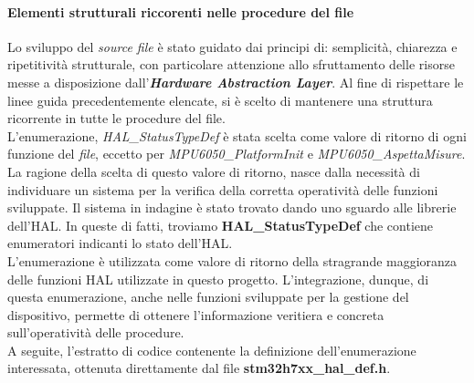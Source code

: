 \paragraph{Elementi strutturali riccorenti nelle procedure del file}
Lo sviluppo del \textit{source file} è stato guidato dai principi di: semplicità, chiarezza e ripetitività strutturale, con particolare attenzione allo sfruttamento delle risorse messe a disposizione dall'\textbf{\textit{Hardware Abstraction Layer}}.
Al fine di rispettare le linee guida precedentemente elencate, si è scelto di mantenere una struttura ricorrente in tutte le procedure del file.\\
L'enumerazione, \textit{HAL\_StatusTypeDef} è stata scelta come valore di ritorno di ogni funzione del \textit{file}, eccetto per \textit{MPU6050\_PlatformInit} e \textit{MPU6050\_AspettaMisure}.
La ragione della scelta di questo valore di ritorno, nasce dalla necessità di individuare un sistema per la verifica della corretta operatività delle funzioni sviluppate. Il sistema in indagine è stato trovato dando uno sguardo alle librerie dell'HAL.
In queste di fatti, troviamo \textbf{HAL\_StatusTypeDef} che contiene enumeratori indicanti lo stato dell'HAL.\\
L'enumerazione è utilizzata come valore di ritorno della stragrande maggioranza delle funzioni HAL utilizzate in questo progetto. L'integrazione, dunque, di questa enumerazione, anche nelle funzioni sviluppate per la gestione del dispositivo, permette di ottenere 
l'informazione veritiera e concreta sull'operatività delle procedure.\\
A seguite, l'estratto di codice contenente la definizione dell'enumerazione interessata, ottenuta direttamente dal file \textbf{stm32h7xx\_hal\_def.h}.

\newpage


